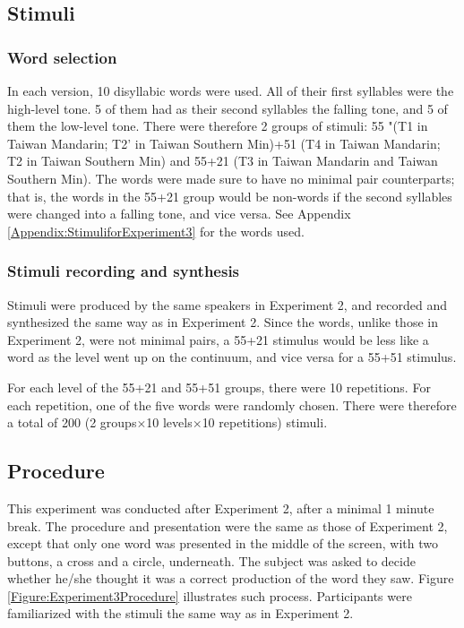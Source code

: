 \documentclass[12pt]{report}
\begin{document}
\begin{CJK}{UTF8}{bsmi}
\subsection{Stimuli}
\subsubsection{Word selection} In each version, 10 disyllabic words were used. All of their first syllables were the high-level tone. 5 of them had as their second syllables the falling tone, and 5 of them the low-level tone. There were therefore 2 groups of stimuli: 55 "(T1 in Taiwan Mandarin; T2' in Taiwan Southern Min)+51 (T4 in Taiwan Mandarin; T2 in Taiwan Southern Min) and 55+21 (T3 in Taiwan Mandarin and Taiwan Southern Min). The words were made sure to have no minimal pair counterparts; that is, the words in the 55+21 group would be non-words if the second syllables were changed into a falling tone, and vice versa. See Appendix \ref{Appendix:StimuliforExperiment3} for the words used.

\subsubsection{Stimuli recording and synthesis}
Stimuli were produced by the same speakers in Experiment 2, and recorded and synthesized the same way as in Experiment 2. Since the words, unlike those in Experiment 2, were not minimal pairs, a 55+21 stimulus would be less like a word as the level went up on the continuum, and vice versa for a 55+51 stimulus.

For each level of the 55+21 and 55+51 groups, there were 10 repetitions. For each repetition, one of the five words were randomly chosen. There were therefore a total of 200 (2 groups$\times$10 levels$\times$10 repetitions) stimuli.

\subsection{Procedure}
This experiment was conducted after Experiment 2, after a minimal 1 minute break. The procedure and presentation were the same as those of Experiment 2, except that only one word was presented in the middle of the screen, with two buttons, a cross and a circle, underneath. The subject was asked to decide whether he/she thought it was a correct production of the word they saw. Figure \ref{Figure:Experiment3Procedure} illustrates such process. Participants were familiarized with the stimuli the same way as in Experiment 2.


\end{CJK}
\end{document}
